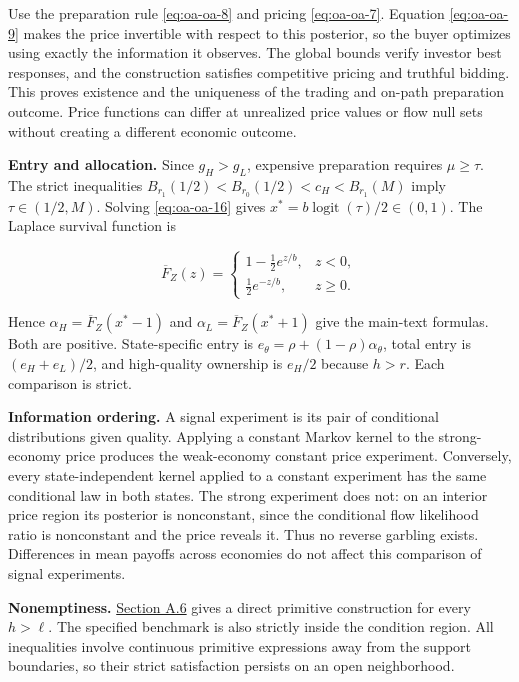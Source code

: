 \documentclass[
  11pt,
]{article}
\begin{document}
Use the preparation rule \eqref{eq:oa-oa-8} and pricing
\eqref{eq:oa-oa-7}. Equation \eqref{eq:oa-oa-9} makes the price
invertible with respect to this posterior, so the buyer optimizes using
exactly the information it observes. The global bounds verify investor
best responses, and the construction satisfies competitive pricing and
truthful bidding. This proves existence and the uniqueness of the
trading and on-path preparation outcome. Price functions can differ at
unrealized price values or flow null sets without creating a different
economic outcome.

\textbf{Entry and allocation.} Since \(g_H>g_L\), expensive preparation
requires \(\mu\ge\tau\). The strict inequalities
\(B_{r_1}(1/2)<B_{r_0}(1/2)<c_H<B_{r_1}(M)\) imply \(\tau\in(1/2,M)\).
Solving \eqref{eq:oa-oa-16} gives
\(x^*=b\operatorname{logit}(\tau)/2\in(0,1)\). The Laplace survival
function is

\[
\overline F_Z(z)=
\begin{cases}
1-\tfrac12e^{z/b},&z<0,\\
\tfrac12e^{-z/b},&z\ge0.
\end{cases}
\tag{OA.17}\label{eq:oa-oa-17}
\]

Hence \(\alpha_H=\overline F_Z(x^*-1)\) and
\(\alpha_L=\overline F_Z(x^*+1)\) give the main-text formulas. Both are
positive. State-specific entry is
\(e_\theta=\rho+(1-\rho)\alpha_\theta\), total entry is \((e_H+e_L)/2\),
and high-quality ownership is \(e_H/2\) because \(h>r\). Each comparison
is strict.

\textbf{Information ordering.} A signal experiment is its pair of
conditional distributions given quality. Applying a constant Markov
kernel to the strong-economy price produces the weak-economy constant
price experiment. Conversely, every state-independent kernel applied to
a constant experiment has the same conditional law in both states. The
strong experiment does not: on an interior price region its posterior is
nonconstant, since the conditional flow likelihood ratio is nonconstant
and the price reveals it. Thus no reverse garbling exists. Differences
in mean payoffs across economies do not affect this comparison of signal
experiments.

\textbf{Nonemptiness.} \hyperref[oa-a-extensions]{Section A.6} gives a
direct primitive construction for every \(h>\ell\). The specified
benchmark is also strictly inside the condition region. All inequalities
involve continuous primitive expressions away from the support
boundaries, so their strict satisfaction persists on an open
neighborhood.
\end{document}
